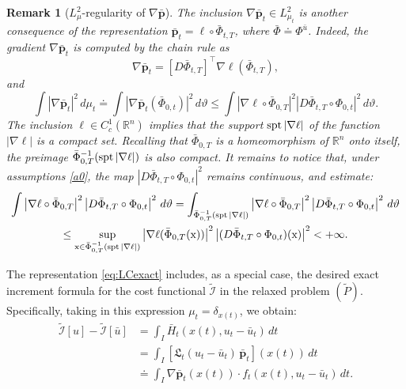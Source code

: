 \documentclass[sn-mathphys-num]{sn-jnl}
\numberwithin{equation}{section}
\theoremstyle{mythm}
\theoremstyle{mydef}
\newtheorem{remark}[proposition]{Remark}
\newcommand{\spt}{\mathop{\rm spt}}
\renewcommand{\d}{\,d}
\newcommand{\R}{\mathbb{R}}
\newcommand{\T}{\intercal}
\begin{document}
\begin{remark}[\({L}^2_{\mu}\)-regularity of $\nabla \bar{\bm p}$]
The inclusion \( \nabla \bar{\bm p}_t \in L^2_{\mu_t}\) is another consequence of the representation \(\bar{\bm p}_t = \ell \circ \bar \Phi_{t,T}\), where $\bar \Phi \doteq \Phi^{\bar {u}}$.
Indeed, the gradient $\nabla \bar{\bm p}_t$ is computed by the chain rule as
  \[
    \nabla \bar{\bm p}_t = \left[D \bar \Phi_{t,T}\right]^\T \nabla \ell(\bar\Phi_{t,T}),
  \]
and
  \[
    \int |\nabla \bar{\bm p}_t|^2\d \mu_t \doteq  \int \left|\nabla \bar{\bm p}_t(\bar \Phi_{0,t})\right|^2\d \vartheta \leq \int\left|\nabla \ell\circ \bar\Phi_{0,T}\right|^2 \left|D \bar\Phi_{t,T}\circ \Phi_{0,t}\right|^2\d \vartheta.
  \]
  The inclusion $\ell \in C^1_c(\R^n)$ implies that the support $\spt|\nabla \ell|$ of the function $|\nabla \ell|$ is a compact set. Recalling that $\bar \Phi_{0,T}$ is a homeomorphism of \(\R^n\) onto itself, the preimage $\bar \Phi_{0,T}^{-1}(\spt|\nabla \ell|)$ is also compact. It remains to notice that, under assumptions \ref{a0}, the map $\left|D \bar\Phi_{t,T}\circ \Phi_{0,t}\right|^2$ remains continuous, and estimate:
  \begin{gather*}
    \int\left|\nabla \ell\circ \bar\Phi_{0,T}\right|^2 \left|D \bar\Phi_{t,T}\circ \Phi_{0,t}\right|^2\d \vartheta = \int_{\bar \Phi_{0,T}^{-1}(\spt|\nabla \ell|)} \left|\nabla \ell\circ \bar\Phi_{0,T}\right|^2 \left|D \bar\Phi_{t,T}\circ \Phi_{0,t}\right|^2\d \vartheta\\
    \leq \sup_{{\mathrm x}\in \bar \Phi_{0,T}^{-1}(\spt|\nabla \ell|)} \left|\nabla \ell(\bar\Phi_{0,T}({\mathrm x}))\right|^2\left|(D \bar\Phi_{t,T}\circ \Phi_{0,t})({\mathrm x})\right|^2 < +\infty.
  \end{gather*}
  \end{remark}
The representation \eqref{eq:LCexact} includes, as a special case, the desired exact increment formula for the cost functional \(\widetilde{\mathcal{I}}\) in the relaxed problem \((\widetilde{P})\). Specifically, taking in this expression \(\mu_t = \delta_{x(t)}\), we obtain:
\begin{align}
\widetilde{\mathcal{I}}[u] - \widetilde{\mathcal{I}}[\bar{u}]
  & = \int_I \bar{H}_t\left(x(t), u_t - \bar{u}_t\right) \, dt\nonumber \\
  & = \int_I \left[\mathfrak{L}_t(u_t - \bar u_t) \,  \bar{\bm{p}}_t\right]\left(x(t)\right) \, dt\nonumber \\
  & \doteq \int_I \nabla \bar{\bm{p}}_t\left(x(t)\right) \cdot f_t\left(x(t), u_t - \bar{u}_t\right) \, dt.\label{incr}
\end{align}
\end{document}
